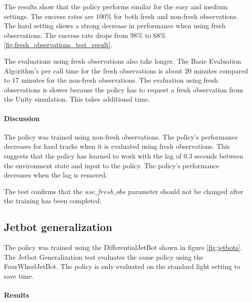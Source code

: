 The results show that the policy performs similar for the easy and medium settings. The success rates are 100\% for both fresh and non-fresh observations. The hard setting shows a strong decrease in performance when using fresh observations. The success rate drops from 98\% to 68\% \ref{fig:fresh_observations_test_result}.

The evaluations using fresh observations also take longer. The Basic Evaluation Algorithm's per call time for the fresh observations is about 20 minutes compared to 17 minutes for the non-fresh observations. The evaluation using fresh observations is slower because the policy has to request a fresh observation from the Unity simulation. This takes additional time.


\paragraph{Discussion}

The policy was trained using non-fresh observations. The policy's performance decreases for hard tracks when it is evaluated using fresh observations.
This suggests that the policy has learned to work with the lag of 0.3 seconds between the environment state and input to the policy. The policy's performance decreases when the lag is removed.

The test confirms that the $use\_fresh\_obs$ parameter should not be changed after the training has been completed.


\subsection{Jetbot generalization}

The policy was trained using the DifferentialJetBot shown in figure \ref{fig:jetbots}. The Jetbot Generalization test evaluates the same policy using the FourWheelJetBot. The policy is only evaluated on the standard light setting to save time.

\paragraph{Results}

